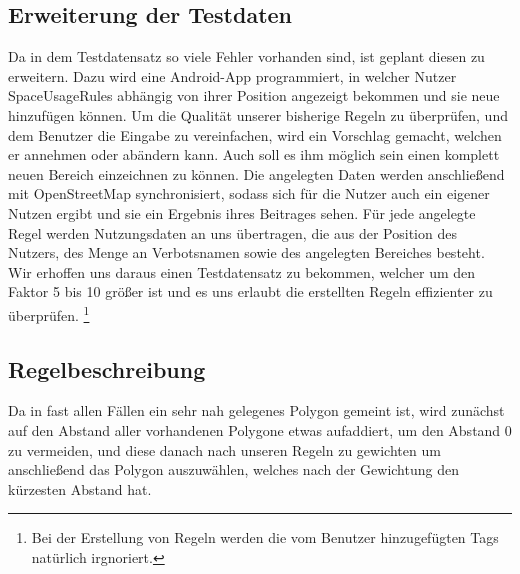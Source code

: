 \subsection{Erweiterung der Testdaten}
Da in dem Testdatensatz so viele Fehler vorhanden sind, ist geplant diesen zu erweitern. Dazu wird eine Android-App programmiert, in welcher Nutzer SpaceUsageRules
abhängig von ihrer Position angezeigt bekommen und sie neue hinzufügen können.
Um die Qualität unserer bisherige Regeln zu überprüfen, und dem Benutzer die Eingabe zu vereinfachen, wird ein Vorschlag gemacht,
welchen er annehmen oder abändern kann. Auch soll es ihm möglich sein einen komplett neuen Bereich einzeichnen zu können.
Die angelegten Daten werden anschließend mit OpenStreetMap synchronisiert, sodass sich für die Nutzer auch ein eigener Nutzen ergibt
und sie ein Ergebnis ihres Beitrages sehen.
Für jede angelegte Regel werden Nutzungsdaten an uns übertragen, die aus der Position des Nutzers, des Menge an Verbotsnamen sowie des angelegten Bereiches besteht.
Wir erhoffen uns daraus einen Testdatensatz zu bekommen, welcher um den Faktor 5 bis 10 größer ist und es uns erlaubt die erstellten Regeln effizienter zu überprüfen.
\footnote{Bei der Erstellung von Regeln werden die vom Benutzer hinzugefügten Tags natürlich irgnoriert.}


\subsection{Regelbeschreibung}
Da in fast allen Fällen ein sehr nah gelegenes Polygon gemeint ist, wird zunächst auf den Abstand aller vorhandenen Polygone etwas aufaddiert,
um den Abstand 0 zu vermeiden, und diese danach nach unseren Regeln zu gewichten um anschließend das Polygon auszuwählen,
welches nach der Gewichtung den kürzesten Abstand hat.
